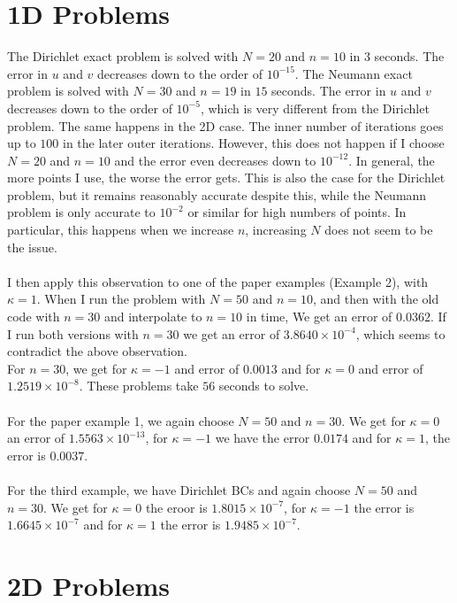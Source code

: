 \documentclass[11pt, a4paper]{article}
\theoremstyle{definition}
\begin{document}
\section{1D Problems}
The Dirichlet exact problem is solved with $N = 20$ and $n = 10$ in $3$ seconds. The error in $u$ and $v$ decreases down to the order of $10^{-15}$.
The Neumann exact problem is solved with $N = 30$ and $n = 19$ in $15$ seconds. The error in $u$ and $v$ decreases down to the order of $10^{-5}$, which is very different from the Dirichlet problem. The same happens in the 2D case. The inner number of iterations goes up to $100$ in the later outer iterations. However, this does not happen if I choose $N = 20$ and $n = 10$ and the error even decreases down to $10^{-12}$. In general, the more points I use, the worse the error gets. This is also the case for the Dirichlet problem, but it remains reasonably accurate despite this, while the Neumann problem is only accurate to $10^{-2}$ or similar for high numbers of points. In particular, this happens when we increase $n$, increasing $N$ does not seem to be the issue.
\\
\\
I then apply this observation to one of the paper examples (Example 2), with $\kappa = 1$. When I run the problem with $N = 50$ and $n = 10$, and then with the old code with $n = 30$ and interpolate to $n = 10$ in time, We get an error of $0.0362$. If I run both versions with $n = 30$ we get an error of $3.8640 \times 10^{-4}$, which seems to contradict the above observation. \\
For $n = 30$, we get for $\kappa =-1$ and error of $0.0013$ and for $\kappa = 0$ and error of $1.2519 \times 10^{-8}$. These problems take $56$ seconds to solve.
\\
\\
For the paper example 1, we again choose $N = 50$ and $n = 30$. We get for $\kappa = 0$ an error of $1.5563 \times 10^{-13}$, for $\kappa = -1$ we have the error $0.0174$ and for $\kappa = 1$, the error is $0.0037$.
\\
\\
For the third example, we have Dirichlet BCs and again choose $N = 50$ and $n = 30$. We get for $\kappa = 0$ the eroor is $1.8015 \times 10^{-7}$, for $\kappa = -1$ the error is $1.6645 \times 10^{-7}$ and for $\kappa  =1$ the error is $1.9485 \times 10^{-7}$.


\section{2D Problems}
\end{document}
